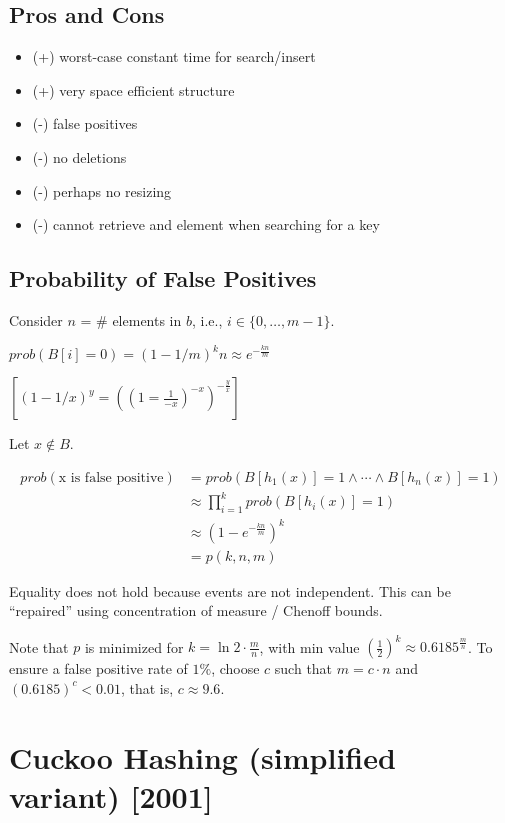 \subsection{Pros and Cons}

\begin{itemize}
\item (+) worst-case constant time for search/insert
\item (+) very space efficient structure
\item (-) false positives
\item (-) no deletions
\item (-) perhaps no resizing
\item (-) cannot retrieve and element when searching for a key
\end{itemize}

\subsection{Probability of False Positives}

Consider $n$ = \# elements in $b$, i.e., $i \in \{0, \ldots, m-1\}$.

\bigskip \noindent ${prob}(B[i] = 0) = (1 - 1/m)^kn \approx e^{-\frac{kn}{m}}$

\bigskip \noindent $\left [ (1 - 1/x)^y = ((1 = \frac{1}{-x})^{-x})^{-\frac{y}{x}} \right ]$

\bigskip \noindent Let $x \notin B$.

\begin{align*}
{prob}(\text{x is false positive}) & = {prob}(B[h_1(x)] = 1 \wedge \cdots \wedge B[h_n(x)]=1) \\
& \approx \prod\limits_{i=1}^k {prob}(B[h_i(x)]=1) \\
& \approx (1 - e^{-\frac{kn}{m}})^k \\
& = p(k, n, m)
\end{align*}

Equality does not hold because events are not independent. This can be ``repaired'' using concentration of measure / Chenoff bounds.

Note that $p$ is minimized for $k = \ln 2 \cdot \frac{m}{n}$, with min value $(\frac{1}{2})^k \approx 0.6185^\frac{m}{n}$. To ensure a false positive rate of $1\%$, choose $c$ such that $m = c \cdot n$ and $(0.6185)^c < 0.01$, that is, $c \approx 9.6$.

\section{Cuckoo Hashing (simplified variant) [2001]}

